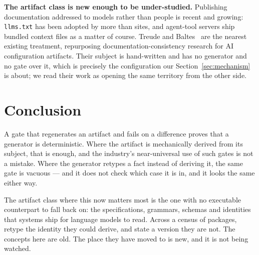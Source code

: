 \documentclass[10pt,journal,compsoc]{IEEEtran}
\begin{document}
\textbf{The artifact class is new enough to be under-studied.} Publishing documentation
addressed to models rather than people is recent and growing: \texttt{llms.txt} has been
adopted by more than \factLlmsTxtSites{} sites, and agent-tool servers ship bundled context
files as a matter of course. Treude and Baltes~\cite{treude2026contextrot} are the nearest
existing treatment, repurposing documentation-consistency research for AI configuration
artifacts. Their subject is hand-written and has no generator and no gate over it, which is
precisely the configuration our Section~\ref{sec:mechanism} is about; we read their work as
opening the same territory from the other side.

\section{Conclusion}\label{sec:conclusion}

A gate that regenerates an artifact and fails on a difference proves that a generator is
deterministic. Where the artifact is mechanically derived from its subject, that is
enough, and the industry's near-universal use of such gates is not a mistake. Where the
generator retypes a fact instead of deriving it, the same gate is vacuous --- and it
does not check which case it is in, and it looks the same either way.

The artifact class where this now matters most is the one with no executable counterpart
to fall back on: the specifications, grammars, schemas and identities that systems ship
for language models to read. Across a census of \factEcoPackages{} packages,
\factEcoRetypedPct{} retype the identity they could derive, and
\factEcoDriftConfirmedPct{} state a version they are not. The concepts here are old. The
place they have moved to is new, and it is not being watched.

\label{refsstart}


\end{document}
